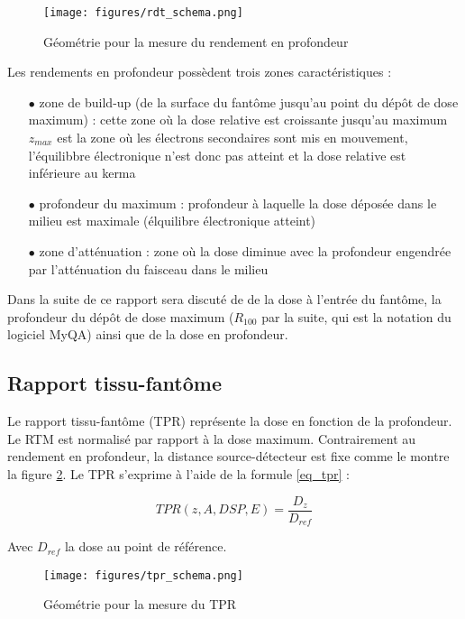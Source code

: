 \documentclass{book}
\begin{document}
\begin{figure}[h]
  \centering
  \texttt{[image: figures/rdt\_schema.png]}
  \caption{Géométrie pour la mesure du rendement en profondeur}
  \label{fig_rdt}
\end{figure}

Les rendements en profondeur possèdent trois zones caractéristiques :

\begin{itemize}
  \item[$\bullet$] zone de build-up (de la surface du fantôme jusqu'au point du dépôt de dose maximum) : cette zone où la dose relative est croissante jusqu'au maximum $z_{max}$ est la zone où les électrons secondaires sont mis en mouvement, l'équilibbre électronique n'est donc pas atteint et la dose relative est inférieure au kerma
  \item[$\bullet$] profondeur du maximum : profondeur à laquelle la dose déposée dans le milieu est maximale (élquilibre électronique atteint)
  \item[$\bullet$] zone d'atténuation : zone où la dose diminue avec la profondeur engendrée par l'atténuation du faisceau dans le milieu
\end{itemize}

Dans la suite de ce rapport sera discuté de de la dose à l'entrée du fantôme, la profondeur du dépôt de dose maximum ($R_{100}$ par la suite, qui est la notation du logiciel MyQA) ainsi que de la dose en profondeur.

\subsection{Rapport tissu-fantôme}

Le rapport tissu-fantôme (TPR) représente la dose en fonction de la profondeur. Le RTM est normalisé par rapport à la dose maximum. Contrairement au rendement en profondeur, la distance source-détecteur est fixe comme le montre la figure \ref*{fig_tpr}. Le TPR s'exprime à l'aide de la formule \ref{eq_tpr} :

\begin{equation}
    TPR(z, A, DSP, E) = \dfrac{D_z}{D_{ref}}
    \label{eq_tpr}
\end{equation}

Avec $D_{ref}$ la dose au point de référence.

\begin{figure}[h] 
  \centering
  \texttt{[image: figures/tpr\_schema.png]}
  \caption{Géométrie pour la mesure du TPR}
  \label{fig_tpr}
\end{figure}
\end{document}
